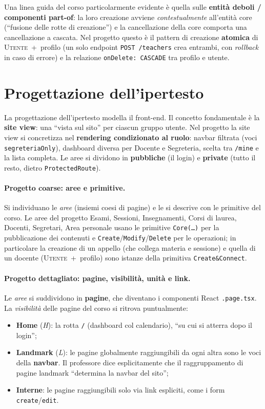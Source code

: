 \documentclass[11pt,a4paper,oneside]{report}
\newcommand{\code}[1]{\texttt{\small #1}}
\newcommand{\file}[1]{\texttt{\small #1}}
\begin{document}
Una linea guida del corso particolarmente evidente è quella sulle \textbf{entità
deboli / componenti part-of}: la loro creazione avviene \emph{contestualmente}
all'entità core (``fusione delle rotte di creazione'') e la cancellazione della
core comporta una cancellazione a cascata. Nel progetto questo è il pattern di
creazione \textbf{atomica} di \textsc{Utente}~+~profilo (un solo endpoint
\code{POST /teachers} crea entrambi, con \emph{rollback} in caso di errore) e la
relazione \code{onDelete: CASCADE} tra profilo e utente.

\section{Progettazione dell'ipertesto}
\label{sec:webml-ipertesto}
La progettazione dell'ipertesto modella il front-end. Il concetto fondamentale è
la \textbf{site view}: una ``vista sul sito'' per ciascun gruppo utente. Nel
progetto la site view si concretizza nel \textbf{rendering condizionato al
ruolo}: navbar filtrata (voci \code{segreteriaOnly}), dashboard diversa per
Docente e Segreteria, scelta tra \code{/mine} e la lista completa. Le aree si
dividono in \textbf{pubbliche} (il login) e \textbf{private} (tutto il resto,
dietro \code{ProtectedRoute}).

\paragraph{Progetto coarse: aree e primitive.} Si individuano le \emph{aree}
(insiemi coesi di pagine) e le si descrive con le primitive del corso. Le aree
del progetto \textemdash{} Esami, Sessioni, Insegnamenti, Corsi di laurea,
Docenti, Segretari, Area personale \textemdash{} usano le primitive
\code{Core(\ldots)} per la pubblicazione dei contenuti e
\code{Create}/\code{Modify}/\code{Delete} per le operazioni; in particolare la
creazione di un appello (che collega materia e sessione) e quella di un docente
(\textsc{Utente}~+~profilo) sono istanze della primitiva
\code{Create\&Connect}.

\paragraph{Progetto dettagliato: pagine, visibilità, unità e link.} Le \emph{aree}
si suddividono in \textbf{pagine}, che diventano i componenti React
\file{*.page.tsx}. La \emph{visibilità} delle pagine del corso si ritrova
puntualmente:
\begin{itemize}[leftmargin=1.4em]
  \item \textbf{Home} (\emph{H}): la rotta \code{/} (dashboard col calendario),
        ``su cui si atterra dopo il login'';
  \item \textbf{Landmark} (\emph{L}): le pagine globalmente raggiungibili da ogni
        altra \textemdash{} sono le voci della \textbf{navbar}. Il professore dice
        esplicitamente che il raggruppamento di pagine landmark ``determina la
        navbar del sito'';
  \item \textbf{Interne}: le pagine raggiungibili solo via link espliciti, come i
        form \code{create}/\code{edit}.
\end{itemize}
\end{document}
